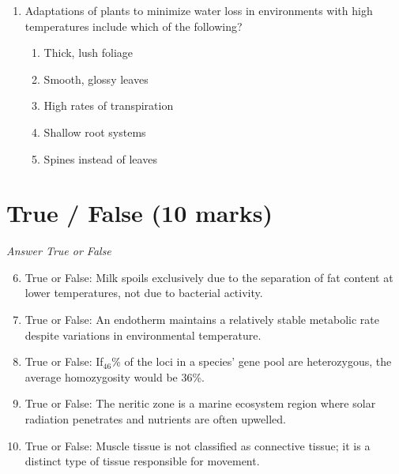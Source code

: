 \documentclass[12pt]{article}
\begin{document}
\begin{enumerate}[label=\arabic*.]
\begin{enumerate}[label=(\alph*)]
    \item Taste, wind direction, humidity
    \item Atmospheric oxygen levels, plant growth, tidal patterns
    \item Infrared radiation, sound frequency, barometric pressure
    \item Moon phases, echo location, gravitational pull
    \item Sunlight intensity, water current, soil composition
\end{enumerate}
\item Adaptations of plants to minimize water loss in environments with high temperatures include which of the following?
\begin{enumerate}[label=(\alph*)]
    \item Thick, lush foliage
    \item Smooth, glossy leaves
    \item High rates of transpiration
    \item Shallow root systems
    \item Spines instead of leaves
\end{enumerate}
\end{enumerate}

\section*{True / False (10 marks)}
\textit{Answer True or False}
\begin{enumerate}[label=\arabic*.]
\setcounter{enumi}{5}
\item True or False: Milk spoils exclusively due to the separation of fat content at lower temperatures, not due to bacterial activity.
\item True or False: An endotherm maintains a relatively stable metabolic rate despite variations in environmental temperature.
\item True or False: If$_{46}$\% of the loci in a species' gene pool are heterozygous, the average homozygosity would be 36\%.
\item True or False: The neritic zone is a marine ecosystem region where solar radiation penetrates and nutrients are often upwelled.
\item True or False: Muscle tissue is not classified as connective tissue; it is a distinct type of tissue responsible for movement.
\end{enumerate}
\end{document}
